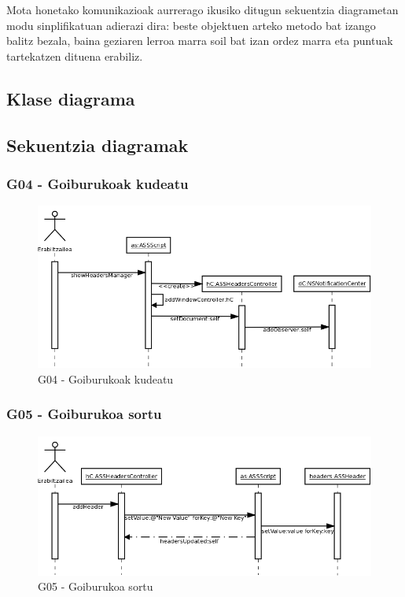 Mota honetako komunikazioak aurrerago ikusiko ditugun sekuentzia diagrametan modu sinplifikatuan adierazi dira: beste objektuen arteko metodo bat izango balitz bezala, baina geziaren lerroa marra soil bat izan ordez marra eta puntuak tartekatzen dituena erabiliz.

\subsection{Klase diagrama}

\newpage
\subsection{Sekuentzia diagramak}

\subsubsection{G04 - Goiburukoak kudeatu}
\begin{figure}[htp]
\begin{center}
\includegraphics[scale=0.35]{Pictures/Chapter4/Diseinua/G04.png}
\caption{G04 - Goiburukoak kudeatu}
\label{g04d}
\end{center}
\end{figure}

\subsubsection{G05 - Goiburukoa sortu}
\begin{figure}[htp]
\begin{center}
\includegraphics[scale=0.35]{Pictures/Chapter4/Diseinua/G05.png}
\caption{G05 - Goiburukoa sortu}
\label{g05d}
\end{center}
\end{figure}


